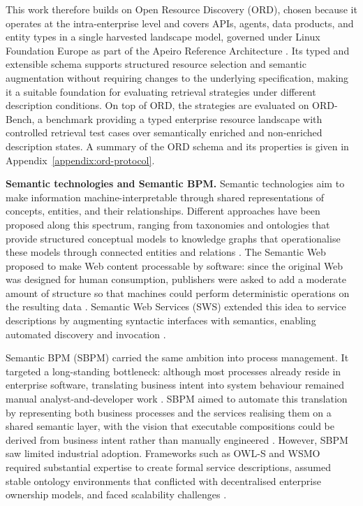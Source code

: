 \documentclass[10pt,twocolumn]{article}
\begin{document}
This work therefore builds on Open Resource Discovery (ORD), chosen because it operates at the intra-enterprise level and covers APIs, agents, data products, and entity types in a single harvested landscape model, governed under Linux Foundation Europe as part of the Apeiro Reference Architecture \citep{linux_foundation_europe_open_nodate,sap_se_apeiro_2026}. Its typed and extensible schema supports structured resource selection and semantic augmentation without requiring changes to the underlying specification, making it a suitable foundation for evaluating retrieval strategies under different description conditions. On top of ORD, the strategies are evaluated on ORD-Bench, a benchmark providing a typed enterprise resource landscape with controlled retrieval test cases over semantically enriched and non-enriched description states. A summary of the ORD schema and its properties is given in Appendix~\ref{appendix:ord-protocol}.


\textbf{Semantic technologies and Semantic BPM.} Semantic technologies aim to make information machine-interpretable through shared representations of concepts, entities, and their relationships. Different approaches have been proposed along this spectrum, ranging from taxonomies and ontologies that provide structured conceptual models to knowledge graphs that operationalise these models through connected entities and relations \citep{schmiedchen_kunstliche_2026,hogan2021}. The Semantic Web proposed to make Web content processable by software: since the original Web was designed for human consumption, publishers were asked to add a moderate amount of structure so that machines could perform deterministic operations on the resulting data \citep{berners-lee_publishing_2001}. Semantic Web Services (SWS) extended this idea to service descriptions by augmenting syntactic interfaces with semantics, enabling automated discovery and invocation \citep{mcilraith_semantic_2001}.

Semantic BPM (SBPM) carried the same ambition into process management. It targeted a long-standing bottleneck: although most processes already reside in enterprise software, translating business intent into system behaviour remained manual analyst-and-developer work \citep{hepp2005}. SBPM aimed to automate this translation by representing both business processes and the services realising them on a shared semantic layer, with the vision that executable compositions could be derived from business intent rather than manually engineered \citep{hepp2005,pedrinaci_semantic_2008}. However, SBPM saw limited industrial adoption. Frameworks such as OWL-S and WSMO required substantial expertise to create formal service descriptions, assumed stable ontology environments that conflicted with decentralised enterprise ownership models, and faced scalability challenges \citep{feier_towards_2005,balzer_pitfalls_2004,hepp_ontology_2007}.
\end{document}
